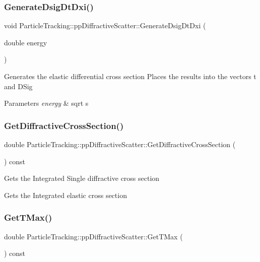 \subsubsection{\texorpdfstring{Generate\+Dsig\+Dt\+Dxi()}{GenerateDsigDtDxi()}}
{\footnotesize\ttfamily void Particle\+Tracking\+::pp\+Diffractive\+Scatter\+::\+Generate\+Dsig\+Dt\+Dxi (\begin{DoxyParamCaption}\item[{double}]{energy }\end{DoxyParamCaption})}

Generates the elastic differential cross section Places the results into the vectors t and D\+Sig 
\begin{DoxyParams}{Parameters}
{\em energy} & sqrt s \\
\hline
\end{DoxyParams}
\mbox{\label{classParticleTracking_1_1ppDiffractiveScatter_a89425dbbdcf14f06ffe2bf50cfde7072}} 
\subsubsection{\texorpdfstring{Get\+Diffractive\+Cross\+Section()}{GetDiffractiveCrossSection()}}
{\footnotesize\ttfamily double Particle\+Tracking\+::pp\+Diffractive\+Scatter\+::\+Get\+Diffractive\+Cross\+Section (\begin{DoxyParamCaption}{ }\end{DoxyParamCaption}) const}

Gets the Integrated Single diffractive cross section

Gets the Integrated elastic cross section \mbox{\label{classParticleTracking_1_1ppDiffractiveScatter_a59b5664ec798af2b1cc682240c477523}} 
\subsubsection{\texorpdfstring{Get\+T\+Max()}{GetTMax()}}
{\footnotesize\ttfamily double Particle\+Tracking\+::pp\+Diffractive\+Scatter\+::\+Get\+T\+Max (\begin{DoxyParamCaption}{ }\end{DoxyParamCaption}) const}

